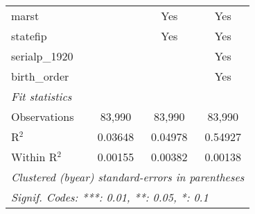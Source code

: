 \begin{tabular}{lccc}
   marst                         &                & Yes             & Yes\\  
   statefip                      &                & Yes             & Yes\\  
   serialp\_1920                 &                &                 & Yes\\  
   birth\_order                  &                &                 & Yes\\  
   \midrule
   \emph{Fit statistics}\\
   Observations                  & 83,990         & 83,990          & 83,990\\  
   R$^2$                         & 0.03648        & 0.04978         & 0.54927\\  
   Within R$^2$                  & 0.00155        & 0.00382         & 0.00138\\  
   \midrule \midrule
   \multicolumn{4}{l}{\emph{Clustered (byear) standard-errors in parentheses}}\\
   \multicolumn{4}{l}{\emph{Signif. Codes: ***: 0.01, **: 0.05, *: 0.1}}\\
\end{tabular}
\par\endgroup


